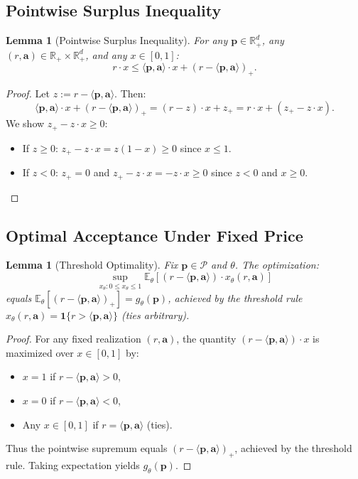 \documentclass[11pt]{article}
\newtheorem{lemma}[theorem]{Lemma}
\newcommand{\ba}{\mathbf{a}}
\newcommand{\bp}{\mathbf{p}}
\newcommand{\E}{\mathbb{E}}
\newcommand{\R}{\mathbb{R}}
\newcommand{\cP}{\mathcal{P}}
\begin{document}
\subsection{Pointwise Surplus Inequality}

\begin{lemma}[Pointwise Surplus Inequality]
\label{lem:surplus-ineq}
For any $\bp \in \R^d_+$, any $(r, \ba) \in \R_+ \times \R^d_+$, and any $x \in [0, 1]$:
\[
r \cdot x \le \langle \bp, \ba \rangle \cdot x + (r - \langle \bp, \ba \rangle)_+.
\]
\end{lemma}

\begin{proof}
Let $z := r - \langle \bp, \ba \rangle$. Then:
\[
\langle \bp, \ba \rangle \cdot x + (r - \langle \bp, \ba \rangle)_+ = (r - z) \cdot x + z_+ = r \cdot x + (z_+ - z \cdot x).
\]
We show $z_+ - z \cdot x \ge 0$:
\begin{itemize}
    \item If $z \ge 0$: $z_+ - z \cdot x = z(1 - x) \ge 0$ since $x \le 1$.
    \item If $z < 0$: $z_+ = 0$ and $z_+ - z \cdot x = -z \cdot x \ge 0$ since $z < 0$ and $x \ge 0$.
\end{itemize}
\end{proof}

\subsection{Optimal Acceptance Under Fixed Price}

\begin{lemma}[Threshold Optimality]
\label{lem:threshold-optimal}
Fix $\bp \in \cP$ and $\theta$. The optimization:
\[
\sup_{x_\theta: 0 \le x_\theta \le 1} \E_\theta\left[(r - \langle \bp, \ba \rangle) \cdot x_\theta(r, \ba)\right]
\]
equals $\E_\theta[(r - \langle \bp, \ba \rangle)_+] = g_\theta(\bp)$, achieved by the threshold rule $x_\theta(r, \ba) = \mathbf{1}\{r > \langle \bp, \ba \rangle\}$ (ties arbitrary).
\end{lemma}

\begin{proof}
For any fixed realization $(r, \ba)$, the quantity $(r - \langle \bp, \ba \rangle) \cdot x$ is maximized over $x \in [0, 1]$ by:
\begin{itemize}
    \item $x = 1$ if $r - \langle \bp, \ba \rangle > 0$,
    \item $x = 0$ if $r - \langle \bp, \ba \rangle < 0$,
    \item Any $x \in [0, 1]$ if $r = \langle \bp, \ba \rangle$ (ties).
\end{itemize}
Thus the pointwise supremum equals $(r - \langle \bp, \ba \rangle)_+$, achieved by the threshold rule. Taking expectation yields $g_\theta(\bp)$.
\end{proof}
\end{document}
